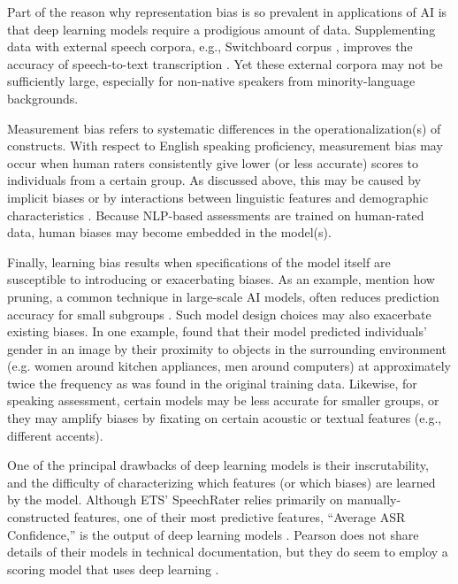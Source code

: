 \documentclass [PhD] {uclathes}
\begin{document}
Part of the reason why representation bias is so prevalent in applications of AI is that deep learning models require a prodigious amount of data. Supplementing data with external speech corpora, e.g., Switchboard corpus \citep{godfrey1997switchboard}, improves the accuracy of speech-to-text transcription \citep{qian2019automatic}. Yet these external corpora may not be sufficiently large, especially for non-native speakers from minority-language backgrounds.

Measurement bias refers to systematic differences in the operationalization(s) of constructs. With respect to English speaking proficiency, measurement bias may occur when human raters consistently give lower (or less accurate) scores to individuals from a certain group. As discussed above, this may be caused by implicit biases \citep{spencer2016} or by interactions between linguistic features and demographic characteristics \citep{zhang2019assessing}. Because NLP-based assessments are trained on human-rated data, human biases may become embedded in the model(s).

Finally, learning bias results when specifications of the model itself are susceptible to introducing or exacerbating biases. As an example, \citet{suresh2021framework} mention how pruning, a common technique in large-scale AI models, often reduces prediction accuracy for small subgroups \citep{hooker2020characterising}. Such model design choices may also exacerbate existing biases. In one example, \citet{zhao2017men} found that their model predicted individuals’ gender in an image by their proximity to objects in the surrounding environment (e.g. women around kitchen appliances, men around computers) at approximately twice the frequency as was found in the original training data. Likewise, for speaking assessment, certain models may be less accurate for smaller groups, or they may amplify biases by fixating on certain acoustic or textual features (e.g., different accents).

One of the principal drawbacks of deep learning models is their inscrutability, and the difficulty of characterizing which features (or which biases) are learned by the model. Although ETS’ SpeechRater relies primarily on manually-constructed features, one of their most predictive features, “Average ASR Confidence,” is the output of deep learning models \citep{qian2019automatic}. Pearson does not share details of their models in technical documentation, but they do seem to employ a scoring model that uses deep learning \citep{cheng2014automatic}.
\end{document}
